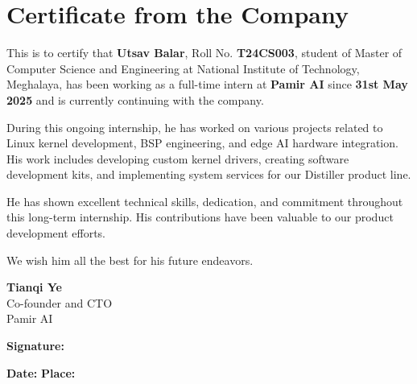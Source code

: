 \documentclass[12pt,a4paper]{report}
\begin{document}
\newpage
\chapter*{Certificate from the Company}

\vspace{1cm}

This is to certify that \textbf{Utsav Balar}, Roll No. \textbf{T24CS003}, student of Master of Computer Science and Engineering at National Institute of Technology, Meghalaya, has been working as a full-time intern at \textbf{Pamir AI} since \textbf{31st May 2025} and is currently continuing with the company.

\vspace{0.5cm}

During this ongoing internship, he has worked on various projects related to Linux kernel development, BSP engineering, and edge AI hardware integration. His work includes developing custom kernel drivers, creating software development kits, and implementing system services for our Distiller product line.

\vspace{0.5cm}

He has shown excellent technical skills, dedication, and commitment throughout this long-term internship. His contributions have been valuable to our product development efforts.

\vspace{0.5cm}

We wish him all the best for his future endeavors.

\vspace{2cm}

\noindent
\textbf{Tianqi Ye} \\
Co-founder and CTO \\
Pamir AI

\vspace{1.5cm}

\noindent
\textbf{Signature:} \underline{\hspace{6cm}}

\vspace{0.5cm}

\noindent
\textbf{Date:} \underline{\hspace{4cm}} \hspace{1cm} \textbf{Place:} \underline{\hspace{4cm}}
\end{document}
